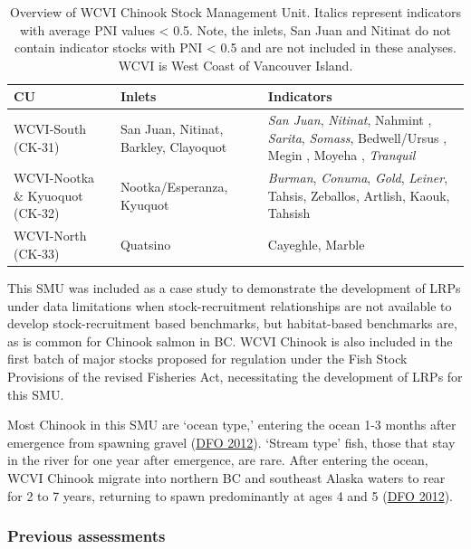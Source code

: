 \documentclass[11pt]{book}
\begin{document}
\renewcommand*{\arraystretch}{1.5}
\begin{table}[ht]
\centering
\caption{Overview of WCVI Chinook Stock Management Unit. Italics represent indicators with average PNI values < 0.5. Note, the inlets, San Juan and Nitinat do not contain indicator stocks with PNI < 0.5 and are not included in these analyses. WCVI is West Coast of Vancouver Island.}
\begin{tabular}{p{}p{}p{}}
\hline
CU       &  Inlets   & Indicators\\ 
\hline
WCVI-South (CK-31) & San Juan, Nitinat, Barkley, Clayoquot & \emph{San Juan}, \emph{Nitinat}, Nahmint , \emph{Sarita}, \emph{Somass}, Bedwell/Ursus , Megin , Moyeha , \emph{Tranquil} \\
WCVI-Nootka \& Kyuoquot (CK-32) & Nootka/Esperanza, Kyuquot & \emph{Burman}, \emph{Conuma}, \emph{Gold}, \emph{Leiner}, Tahsis, Zeballos, Artlish, Kaouk, Tahsish \\
WCVI-North (CK-33) &  Quatsino  & Cayeghle, Marble \\                     
\hline
\end{tabular}
\label{tab:chinook-Overview}
\end{table}
This SMU was included as a case study to demonstrate the development of LRPs under data limitations when stock-recruitment relationships are not available to develop stock-recruitment based benchmarks, but habitat-based benchmarks are, as is common for Chinook salmon in BC. WCVI Chinook is also included in the first batch of major stocks proposed for regulation under the Fish Stock Provisions of the revised Fisheries Act, necessitating the development of LRPs for this SMU.

Most Chinook in this SMU are `ocean type,' entering the ocean 1-3 months after emergence from spawning gravel (\protect\hyperlink{ref-dfoAssessmentWestCoast2012}{DFO 2012}). `Stream type' fish, those that stay in the river for one year after emergence, are rare. After entering the ocean, WCVI Chinook migrate into northern BC and southeast Alaska waters to rear for 2 to 7 years, returning to spawn predominantly at ages 4 and 5 (\protect\hyperlink{ref-dfoAssessmentWestCoast2012}{DFO 2012}).

\hypertarget{previous-assessments-1}{%
\subsubsection{Previous assessments}\label{previous-assessments-1}}
\end{document}
